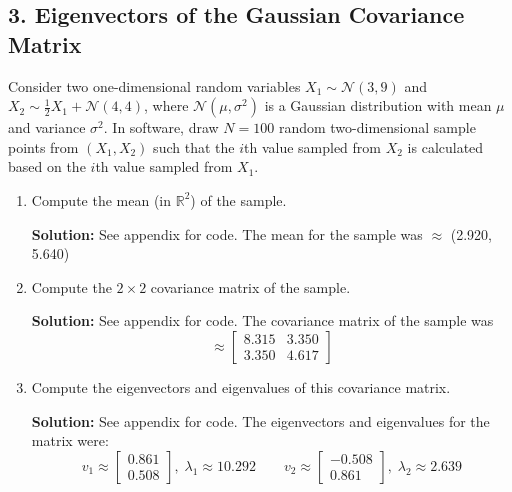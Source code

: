 \documentclass{article}
\newcommand{\solution}{\textbf{Solution: }}
\newcommand{\N}{\mathcal{N}}
\newcommand{\R}{\mathbb{R}}
\begin{document}
\subsection*{3. Eigenvectors of the Gaussian Covariance Matrix}
Consider two one-dimensional random variables $X_1 \sim \N(3, 9)$ and $X_2 \sim \frac{1}{2}X_1 + \N(4, 4)$, where $\N(\mu, \sigma^2)$  is a Gaussian distribution with mean $\mu$ and variance $\sigma^2$. In software, draw $N = 100$ random two-dimensional sample points from $(X_1, X_2)$ such that the $i$th value sampled from $X_2$ is calculated based on the $i$th value sampled from $X_1$. 
\begin{enumerate}[label=(\alph*)]
    \item Compute the mean (in $\R^2$) of the sample. 
    \begin{mdframed} \solution
    See appendix for code. The mean for the sample was $\approx$ (2.920, 5.640)
    \end{mdframed}
    
    \item Compute the $2 \times 2$ covariance matrix of the sample.
    \begin{mdframed} \solution
    See appendix for code. The covariance matrix of the sample was
    $$\approx\begin{bmatrix}
    8.315 & 3.350\\
    3.350 & 4.617\end{bmatrix}$$    
    \end{mdframed}
    
    \item Compute the eigenvectors and eigenvalues of this covariance matrix. 
    \begin{mdframed} \solution
    See appendix for code. The eigenvectors and eigenvalues for the matrix were:
    $$v_1\approx\begin{bmatrix}0.861\\0.508\end{bmatrix},\; \lambda_1\approx 10.292 \qquad v_2\approx\begin{bmatrix}-0.508\\0.861\end{bmatrix},\;\lambda_2\approx 2.639$$
    \end{mdframed}
    

\end{enumerate}
\end{document}
